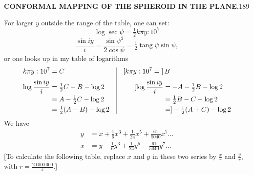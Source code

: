 \par\clearpage
\noindent\null\hfill{\small\textbf{CONFORMAL MAPPING OF THE SPHEROID IN THE PLANE.}}\hfill189\par\medskip
For larger \(y\) outside the range of the table, one can set:
\[\log\sec\psi=\tfrac12k\pi y:10^7\]
\[\frac{\sin iy}{i}=\frac{\sin\psi^2}{2\cos\psi}=\tfrac12\operatorname{tang}\psi\sin\psi,\]
\noindent or one looks up in my table of logarithms
\[
\begin{array}{@{}r@{\quad}|@{\quad}l@{}}
\begin{aligned}
k\pi y:10^7&=C\\[3pt]
\log\frac{\sin iy}{i}&=\tfrac12C-B-\log2\\
&=A-\tfrac12C-\log2\\
&=\tfrac12(A-B)-\log2
\end{aligned}
&\begin{aligned}
\mathopen{[}k\pi y:10^7={}]&\,B\\[3pt]
[\log\frac{\sin iy}{i}&=-A-\tfrac12B-\log2\\
&=\tfrac12B-C-\log2\\
&=]-\tfrac12(A+C)-\log2
\end{aligned}
\end{array}
\]
We have
\[
\begin{aligned}
y&=x+\tfrac16x^3+\tfrac1{24}x^5+\tfrac{61}{5040}x^7\ldots\\
x&=y-\tfrac16y^3+\tfrac1{24}y^5-\tfrac{61}{5040}y^7\ldots
\end{aligned}
\]
[To calculate the following table, replace \(x\) and \(y\) in these two series by \(\frac{x}{r}\) and \(\frac{y}{r}\), with \(r=\frac{20\,000\,000}{\pi}\).]
